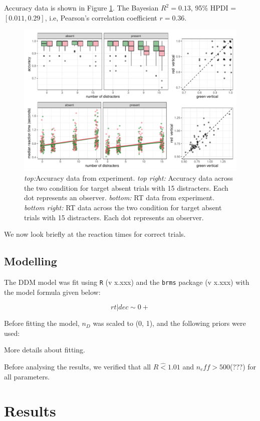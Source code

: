 \documentclass[11pt, twoside, twocolumn]{article}
\begin{document}
Accuracy data is shown in Figure \ref{fig:lvl3_emp}. The Bayesian $R^2 = 0.13$, 95\% HPDI = $[0.011, 0.29]$, i.e, Pearson's correlation coefficient $r = 0.36$.

\begin{figure}
\centering
\includegraphics[width=\linewidth]{figs/exp_lvl_3_emp.pdf}
\caption{\textit{top:}Accuracy data from experiment. \textit{top right:} Accuracy data across the two condition for target absent trials with 15 distracters. Each dot represents an observer. \textit{bottom:} RT data from experiment. \textit{bottom right:} RT data across the two condition for target absent trials with 15 distracters. Each dot represents an observer.}
\label{fig:lvl3_emp}
\end{figure}

We now look briefly at the reaction times for correct trials. 

\subsection{Modelling}

The DDM model was fit using \texttt{R} (v x.xxx) and the \texttt{brms} package (v x.xxx) with the model formula given below:

$$rt | dec \sim 0 + $$

Before fitting the model, $n_D$ was scaled to (0, 1), and the following priors were used:

More details about fitting. 

Before analysing the results, we verified that all $R\hat < 1.01$ and $n_eff>500$(???) for all parameters. 

\section{Results}
\end{document}
